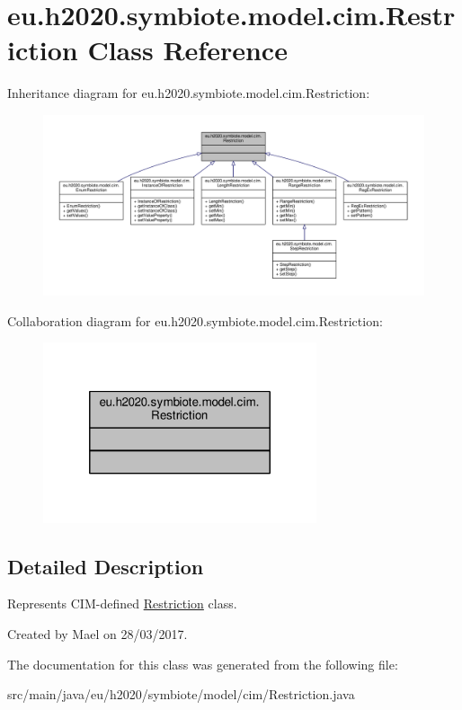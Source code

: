 \hypertarget{classeu_1_1h2020_1_1symbiote_1_1model_1_1cim_1_1Restriction}{}\section{eu.\+h2020.\+symbiote.\+model.\+cim.\+Restriction Class Reference}
\label{classeu_1_1h2020_1_1symbiote_1_1model_1_1cim_1_1Restriction}


Inheritance diagram for eu.\+h2020.\+symbiote.\+model.\+cim.\+Restriction\+:
\nopagebreak
\begin{figure}[H]
\begin{center}
\leavevmode
\includegraphics[width=350pt]{classeu_1_1h2020_1_1symbiote_1_1model_1_1cim_1_1Restriction__inherit__graph}
\end{center}
\end{figure}


Collaboration diagram for eu.\+h2020.\+symbiote.\+model.\+cim.\+Restriction\+:
\nopagebreak
\begin{figure}[H]
\begin{center}
\leavevmode
\includegraphics[width=228pt]{classeu_1_1h2020_1_1symbiote_1_1model_1_1cim_1_1Restriction__coll__graph}
\end{center}
\end{figure}


\subsection{Detailed Description}
Represents C\+I\+M-\/defined \hyperlink{classeu_1_1h2020_1_1symbiote_1_1model_1_1cim_1_1Restriction}{Restriction} class.

Created by Mael on 28/03/2017. 

The documentation for this class was generated from the following file\+:\begin{DoxyCompactItemize}
\item 
src/main/java/eu/h2020/symbiote/model/cim/Restriction.\+java\end{DoxyCompactItemize}
